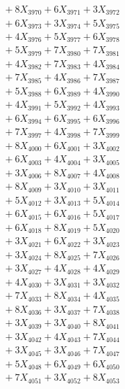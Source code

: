 \documentclass[a4paper,10pt]{article}
\begin{document}
{\begin{align}
&\;  + 8 X_{3970} + 6 X_{3971} + 3 X_{3972} \\[0.3ex]
&\;  + 6 X_{3973} + 3 X_{3974} + 5 X_{3975} \\[0.3ex]
&\;  + 4 X_{3976} + 5 X_{3977} + 6 X_{3978} \\[0.3ex]
&\;  + 5 X_{3979} + 7 X_{3980} + 7 X_{3981} \\[0.3ex]
&\;  + 4 X_{3982} + 7 X_{3983} + 4 X_{3984} \\[0.3ex]
&\;  + 7 X_{3985} + 4 X_{3986} + 7 X_{3987} \\[0.3ex]
&\;  + 5 X_{3988} + 6 X_{3989} + 4 X_{3990} \\[0.3ex]
&\;  + 4 X_{3991} + 5 X_{3992} + 4 X_{3993} \\[0.3ex]
&\;  + 6 X_{3994} + 6 X_{3995} + 6 X_{3996} \\[0.3ex]
&\;  + 7 X_{3997} + 4 X_{3998} + 7 X_{3999} \\[0.5ex]\allowbreak
&\;  + 8 X_{4000} + 6 X_{4001} + 3 X_{4002} \\[0.3ex]
&\;  + 6 X_{4003} + 4 X_{4004} + 3 X_{4005} \\[0.3ex]
&\;  + 3 X_{4006} + 8 X_{4007} + 4 X_{4008} \\[0.3ex]
&\;  + 8 X_{4009} + 3 X_{4010} + 3 X_{4011} \\[0.3ex]
&\;  + 5 X_{4012} + 3 X_{4013} + 5 X_{4014} \\[0.3ex]
&\;  + 6 X_{4015} + 6 X_{4016} + 5 X_{4017} \\[0.3ex]
&\;  + 6 X_{4018} + 8 X_{4019} + 5 X_{4020} \\[0.3ex]
&\;  + 3 X_{4021} + 6 X_{4022} + 3 X_{4023} \\[0.3ex]
&\;  + 3 X_{4024} + 8 X_{4025} + 7 X_{4026} \\[0.3ex]
&\;  + 3 X_{4027} + 4 X_{4028} + 4 X_{4029} \\[0.5ex]\allowbreak
&\;  + 4 X_{4030} + 3 X_{4031} + 3 X_{4032} \\[0.3ex]
&\;  + 7 X_{4033} + 8 X_{4034} + 4 X_{4035} \\[0.3ex]
&\;  + 8 X_{4036} + 3 X_{4037} + 7 X_{4038} \\[0.3ex]
&\;  + 3 X_{4039} + 3 X_{4040} + 8 X_{4041} \\[0.3ex]
&\;  + 3 X_{4042} + 4 X_{4043} + 7 X_{4044} \\[0.3ex]
&\;  + 3 X_{4045} + 3 X_{4046} + 7 X_{4047} \\[0.3ex]
&\;  + 5 X_{4048} + 6 X_{4049} + 6 X_{4050} \\[0.3ex]
&\;  + 7 X_{4051} + 3 X_{4052} + 8 X_{4053} \\[0.3ex]

\end{align}}
\end{document}
